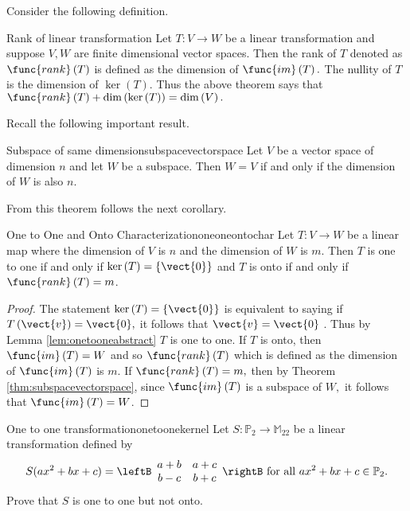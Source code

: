 Consider the following definition. 

\begin{definition}{Rank of linear transformation}{}
Let $T:V\rightarrow W$ be a linear transformation and suppose $V,W$ are finite dimensional vector spaces. Then
the rank of $T$ denoted as $\func{rank}\left( T\right) $ is defined as the
dimension of $\func{im}\left( T\right) .$ The nullity of $T$ is the
dimension of $\ker \left( T\right) .$ Thus the above theorem says that $
\func{rank}\left( T\right) +\dim \left( \ker \left( T\right) \right) =\dim
\left( V\right) .$
\end{definition}

Recall the following important result. 

\begin{theorem}{Subspace of same dimension}{subspacevectorspace}
Let $V$ be a vector space of dimension $n$ and let $W$ be a
subspace. Then $W=V$ if and only if the dimension of $W$ is also $n$.
\end{theorem}

From this theorem follows the next corollary.

\begin{corollary}{One to One and Onto Characterization}{oneoneontochar}
Let $T:V\rightarrow W$ be a linear map where the dimension of $V$ is $n$ and
the dimension of $W$ is $m$. Then $T$ is one to one if and only if $\ker
\left( T\right) =\left\{ \vect{0}\right\} $ and $T$ is onto if and only if $
\func{rank}\left( T\right) =m$.
\end{corollary}

\begin{proof}
The statement $\ker \left( T \right) =\left\{ \vect{0}\right\} $
is equivalent to saying if $T \left( \vect{v} \right)=\vect{0},$ it follows that $\vect{v}=\vect{0}$
. Thus by Lemma \ref{lem:onetooneabstract} $T$ is one to one. If $T$ is onto, then $
\func{im}\left( T\right) =W$ and so $\func{rank}\left( T\right) $ which is
defined as the dimension of $\func{im}\left( T\right) $ is $m$. If $\func{
rank}\left( T\right) =m,$ then by Theorem \ref{thm:subspacevectorspace}, since $\func{im}
\left( T\right) $ is a subspace of $W,$ it follows that $\func{im}\left(
T\right) =W$. 
\end{proof}

\begin{example}{One to one transformation}{onetoonekernel}
Let $S:\mathbb{P}_2\to\mathbb{M}_{22}$ be a linear transformation
defined by
\[ S(ax^2+bx+c)
=
\leftB\begin{array}{cc}
a+b & a+c \\ b-c & b+c \end{array}\rightB
\mbox{ for all }
 ax^2+bx+c\in \mathbb{P}_2.\]
Prove that $S$ is one to one but not onto.
\end{example}

